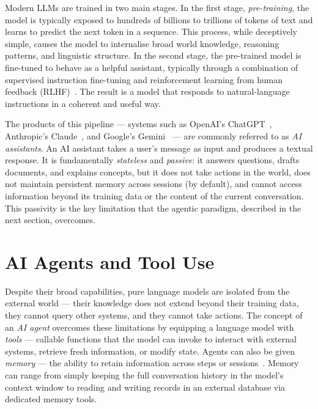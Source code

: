 \documentclass[
  digital,     %
  oneside,     %
  nosansbold,  %
  nocolorbold, %
  lof,         %
  lot,         %
]{fithesis4}
\begin{document}
Modern LLMs are trained in two main stages. In the first stage,
\textit{pre-training}, the model is typically exposed to hundreds of billions to trillions of
tokens of text and learns to predict the next token in a sequence. This
process, while deceptively simple, causes the model to internalise broad
world knowledge, reasoning patterns, and linguistic structure. In the second
stage, the pre-trained model is fine-tuned to behave as a helpful assistant,
typically through a combination of supervised instruction fine-tuning and
reinforcement learning from human feedback
(RLHF)~\parencite{ouyang2022rlhf}. The result is a model that responds to
natural-language instructions in a coherent and useful way.

The products of this pipeline --- systems such as OpenAI's
ChatGPT~\parencite{chatgpt}, Anthropic's Claude~\parencite{claude}, and
Google's Gemini~\parencite{gemini} --- are commonly referred to as \textit{AI
assistants}. An AI assistant takes a user's message as input and produces a
textual response. It is fundamentally \textit{stateless} and
\textit{passive}: it answers questions, drafts documents, and explains
concepts, but it does not take actions in the world, does not maintain
persistent memory across sessions (by default), and cannot access
information beyond its training data or the content of the current
conversation. This passivity is the key limitation that the agentic
paradigm, described in the next section, overcomes.

\section{AI Agents and Tool Use}
\label{sec:ai-agents}

Despite their broad capabilities, pure language models are isolated from
the external world --- their knowledge does not extend beyond their training
data, they cannot query other systems, and they cannot take actions. The
concept of an \textit{AI agent} overcomes these limitations by equipping a
language model with \textit{tools} --- callable functions that the model can
invoke to interact with external systems, retrieve fresh information, or
modify state. Agents can also be given \textit{memory} --- the ability to
retain information across steps or sessions~\parencite{zhang2024memory}.
Memory can range from simply keeping the full conversation history in the
model's context window to reading and writing records in an external
database via dedicated memory tools.
\end{document}
